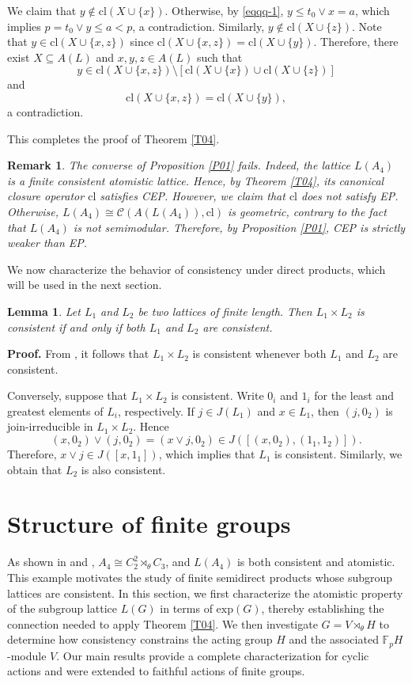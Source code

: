 \documentclass[12pt]{article}
\newtheorem{lemma}{\bf Lemma}[section]
\newtheorem{remark}{\bf Remark}[section]
\def\QEDopen{{\setlength{\fboxsep}{0pt}\setlength{\fboxrule}{0.2pt}\fbox{\rule[0pt]{0pt}{1.3ex}\rule[0pt]{1.3ex}{0pt}}}}
\def\QED{\QEDopen}
\def\proof{{\bf Proof.} }
\def\endproof{\hspace*{\fill}~\QED\par\endtrivlist\unskip}
\begin{document}
We claim that $y\notin \mbox{cl}(X\cup \{x\})$. Otherwise, by \eqref{eqqq-1}, $y\leq t_0\vee x=a$, which implies $p=t_0\vee y\leq a<p$, a contradiction. Similarly, $y\notin \mbox{cl}(X\cup \{z\})$. Note that $y\in \mbox{cl}(X\cup \{x,z\})$ since $\mbox{cl}(X\cup\{x,z\})=\mbox{cl}(X\cup\{y\})$. Therefore, there exist $X\subseteq A(L)$ and $x, y, z\in A(L)$ such that
$$y\in \mbox{cl}(X\cup\{x,z\}) \setminus [\mbox{cl}(X\cup\{x\})\cup \mbox{cl}(X\cup \{z\})]$$  and  $$\mbox{cl}(X\cup\{x,z\})=\mbox{cl}(X\cup\{y\}),$$ a contradiction. 

This completes the proof of Theorem \ref{T04}. 
\endproof

\begin{remark}\label{R+11}
\emph{The converse of Proposition \ref{P01} fails. Indeed, the lattice $L(A_4)$ is a finite consistent atomistic lattice. 
Hence, by Theorem \ref{T04}, its canonical closure operator $\mbox{cl}$ satisfies CEP. However, we claim that $\mbox{cl}$ does not satisfy EP. Otherwise, 
$L(A_4)\cong \mathcal{C}(A(L(A_4)), \mbox{cl})$ is geometric, contrary to the fact that $L(A_4)$ is not semimodular. Therefore, by Proposition \ref{P01}, CEP is strictly weaker than EP.} 
\end{remark}

We now characterize the behavior of consistency under direct products, which will be used in the next section.
\begin{lemma}\label{Lem4.0}
Let $L_1$ and $L_2$ be two lattices of finite length. Then $L_1\times L_2$ is consistent if and only if both $L_1$ and $L_2$ are consistent.
\end{lemma}
\proof
From \cite{Stern99}, it follows that $L_1\times L_2$ is consistent whenever both $L_1$ and $L_2$ are consistent. 

Conversely, suppose that $L_1\times L_2$ is consistent. Write $0_i$ and $1_i$ for the least and greatest elements of $L_i$, respectively.
If $j\in J(L_1)$ and $x\in L_1$, then $(j,0_2)$ is join-irreducible in $L_1\times L_2$. Hence $$(x,0_2)\vee (j,0_2)=(x\vee j,0_2)\in J([(x,0_2), (1_1,1_2)]).$$ Therefore, $x\vee j\in J([x,1_1])$, which implies that $L_1$ is consistent. Similarly, we obtain that $L_2$ is also consistent.  \endproof

\section{Structure of finite groups}
As shown in \cite{Rotman} and \cite{Stern99}, $A_4\cong C^2_{2} \rtimes_{\theta} C_3$, and $L(A_4)$ is both consistent and atomistic. This example motivates the study of finite semidirect products whose subgroup lattices are consistent. In this section, we first characterize the atomistic property of the subgroup lattice $L(G)$ in terms of $\mbox{exp}(G)$, thereby establishing the connection needed to apply Theorem \ref{T04}. We then investigate $G=V\rtimes_\theta H$ to determine how consistency constrains the acting group $H$ and the associated $\mathbb{F}_pH$-module $V$. Our main results provide a complete characterization for cyclic actions and were extended to faithful actions of finite groups.
\end{document}
